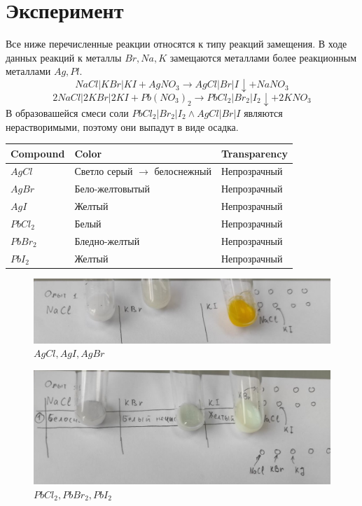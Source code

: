 \section{Эксперимент}
Все ниже перечисленные реакции относятся к типу 
реакций замещения. В ходе данных реакций к металлы 
$Br, Na, K$ замещаются металлами более реакционным 
металлами $Ag, Pl$. 
\begin{equation} 
    NaCl|KBr|KI + AgNO_3 \xrightarrow{}   AgCl|Br|I\downarrow + NaNO_3
\end{equation} 
\begin{equation} 
    2NaCl|2KBr|2KI + Pb(NO_3)_2 \xrightarrow{}  PbCl_2|Br_2|I_2\downarrow  + 2 KNO_3
\end{equation} 
В образовашейся смеси соли $PbCl_2|Br_2|I_2 \land AgCl|Br|I$
являются нерастворимыми, поэтому они выпадут 
в виде осадка.

\begin{center}
\begin{tabular}{l||l||l}
    Compound & Color & Transparency \\ \hline \hline
    $AgCl$ & Светло серый $\to$ белоснежный & Непрозрачный \\
    $AgBr$ & Бело-желтовытый & Непрозрачный\\
    $AgI$ & Желтый & Непрозрачный\\
    $PbCl_2$ & Белый & Непрозрачный \\
    $PbBr_2$ & Бледно-желтый & Непрозрачный \\
    $PbI_2$ & Желтый & Непрозрачный \\
\end{tabular}
\end{center}

\begin{figure}[h]
    \centering
    \includegraphics[width=1\linewidth]{Ex_1/1.jpg}
     \caption{$AgCl, AgI, AgBr$}
    \label{ex_1_1}
\end{figure}

\begin{figure}[h]
    \centering
    \includegraphics[width=1\linewidth]{Ex_1/2.jpg}
     \caption{$PbCl_2, PbBr_2, PbI_2$}
    \label{ex_1_2}
\end{figure}